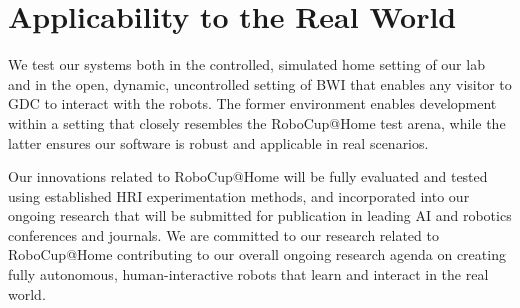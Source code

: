 \section{Applicability to the Real World}

We test our systems both in the controlled, simulated home setting of our lab and in the open, dynamic, uncontrolled setting of BWI that
enables any visitor to GDC to interact with the robots.
The former environment enables development within a setting that
closely resembles the RoboCup@Home test arena, while the latter
ensures our software is robust and applicable in real scenarios.

Our innovations related to RoboCup@Home will
be fully evaluated and tested using established HRI experimentation
methods, and incorporated into our ongoing research that will be
submitted for publication in leading AI and robotics conferences and
journals.  We are committed to our research related to RoboCup@Home
contributing to our overall ongoing research agenda on creating fully
autonomous, human-interactive robots that learn and interact in the
real world.
